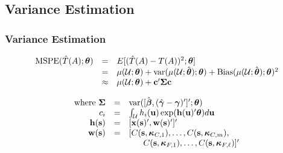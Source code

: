 \documentclass[mathserif,compress]{beamer}
\def\bdm{\begin{displaymath}}
\def\edm{\end{displaymath}}
\def\bc{\mathbf{c}}
\def\bh{\mathbf{h}}
\def\bs{\mathbf{s}}
\def\bu{\mathbf{u}}
\def\bw{\mathbf{w}}
\def\bx{\mathbf{x}}
\def\cU{\mathcal{U}}
\def\bbeta{\mbox{\boldmath $\beta$}}
\def\bgamma{\mbox{\boldmath $\gamma$}}
\def\bkappa{\mbox{\boldmath $\kappa$}}
\def\btheta{\mbox{\boldmath $\theta$}}
\def\bSigma{\mbox{\boldmath $\Sigma$}}
\def\var{\textrm{var}}
\begin{document}
\subsection{Variance Estimation}
\begin{frame} 
\frametitle{Variance Estimation}

\hspace{-.6cm}
	\bdm
		\begin{array} {r c l}
			\textrm{MSPE}(\hat{T}(A);\btheta) &=& E[(\hat{T}(A) - T(A))^2;\btheta] \\ 
				&=& \mu(\cU;\btheta) + \var(\mu(\cU;\hat{\btheta});\btheta) + 
				\textrm{Bias}(\mu(\cU;\hat{\btheta});\btheta)^2 \\
			&\approx& \mu(\cU;\btheta) + \bc^\prime\bSigma\bc
		\end{array}
	\edm

	\bdm
		\begin{array} {r c l}
			\textrm{where } \bSigma &=& \var([\hat{\bbeta},(\hat{\bgamma} - 
				\bgamma)^\prime]^\prime;\btheta) \\
			c_i &=& \int_{\cU}h_i(\bu)\exp(\bh(\bu)^\prime\btheta) d\bu \\
			\bh(\bs) &=& [\bx(\bs)^\prime,\bw(\bs)^\prime]^\prime \\
			\bw(\bs) &=& [C(\bs,\bkappa_{C,1}),\ldots,C(\bs,\bkappa_{C,m}), \\ 
				& & \hspace{.6cm} C(\bs,\bkappa_{F,1}),\ldots,C(\bs,\bkappa_{F,\ell})]^\prime
		\end{array}
	\edm

\end{frame}

\end{document}
